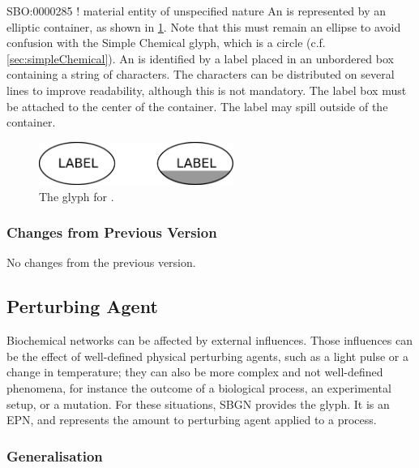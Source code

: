 \begin{glyphDescription}
\glyphSboTerm SBO:0000285 ! material entity of unspecified nature 
\glyphContainer An  is represented by an
elliptic container, as shown in \ref{fig:unspecified}.  Note that this
must remain an ellipse to avoid confusion with the Simple Chemical
glyph, which is a circle (c.f.\, \ref{sec:simpleChemical}).
\glyphLabel An  is identified by a label
placed in an unbordered box containing a string of characters.  The
characters can be distributed on several lines to improve readability,
although this is not mandatory.  The label box must be attached to the
center of the container.  The label may spill outside of the
container.
\end{glyphDescription}

\begin{figure}[H]
  \centering
  \includegraphics[width=2.5in]{images/unspecified}
  \caption{The \PD glyph for .}
  \label{fig:unspecified}
\end{figure}

\subsubsection{Changes from Previous Version}

No changes from the previous version.

\subsection{Perturbing Agent}
\label{sec:perturbing agent}

Biochemical networks can be affected by external influences.  Those
influences can be the effect of well-defined physical perturbing
agents, such as a light pulse or a change in temperature; they can
also be more complex and not well-defined phenomena, for instance the
outcome of a biological process, an experimental setup, or a mutation.
For these situations, SBGN provides the 
glyph. It is an EPN, and represents the amount to perturbing agent
applied to a process.

\subsubsection{Generalisation}

